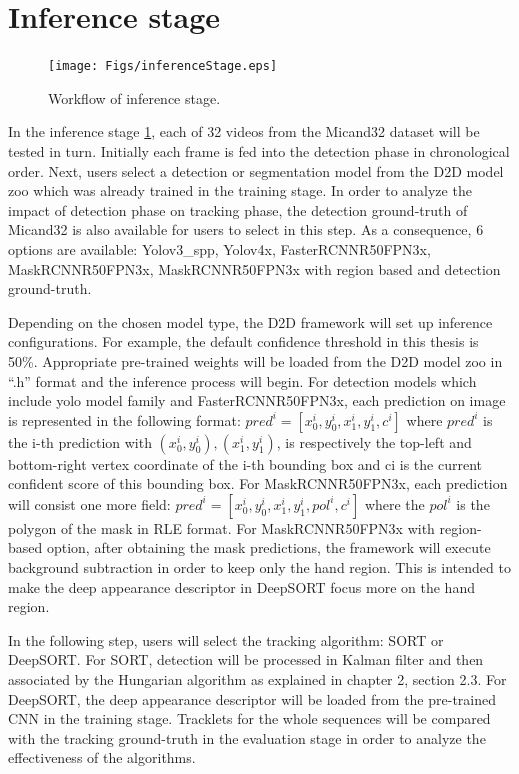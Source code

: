 \section{Inference stage}\label{sec:inferstage}
\begin{figure}[htbp]
\centerline{\texttt{[image: Figs/inferenceStage.eps]}}
\caption{Workflow of inference stage.}
\label{fig:inferenceStage}
\end{figure}

In the inference stage \ref{fig:inferenceStage}, each of 32 videos from the Micand32 dataset will be tested in turn. Initially each frame is fed into the detection phase in chronological order. Next, users select a detection or segmentation model from the D2D model zoo which was already trained in the training stage. In order to analyze the impact of detection phase on tracking phase, the detection ground-truth of Micand32 is also available for users to select in this step. As a consequence, 6 options are available: Yolov3\_spp, Yolov4x, FasterRCNNR50FPN3x, MaskRCNNR50FPN3x, MaskRCNNR50FPN3x with region based and detection ground-truth.

Depending on the chosen model type, the D2D framework will set up inference configurations. For example, the default confidence threshold in this thesis is 50\%. Appropriate pre-trained weights will be loaded from the D2D model zoo in “.h” format and the inference process will begin. For detection models which include yolo model family and FasterRCNNR50FPN3x, each prediction on image is represented in the following format: \(pred^i = [x_0^i, y_0^i, x_1^i, y_1^i, c^i]\) where \(pred^i\) is the i-th prediction with \((x_0^i, y_0^i),  (x_1^i, y_1^i)\), is respectively the top-left and bottom-right vertex coordinate of the i-th bounding box and ci is the current confident score of this bounding box. For MaskRCNNR50FPN3x, each prediction will consist one more field: \(pred^i = [x_0^i, y_0^i, x_1^i, y_1^i, pol^i, c^i]\) where the \(pol^i\) is the polygon of the mask in RLE format. For MaskRCNNR50FPN3x with region-based option, after obtaining the mask predictions, the framework will execute background subtraction in order to keep only the hand region. This is intended to make the deep appearance descriptor in DeepSORT focus more on the hand region.

In the following step, users will select the tracking algorithm: SORT or DeepSORT. For SORT, detection will be processed in Kalman filter and then associated by the Hungarian algorithm as explained in chapter 2, section 2.3. For DeepSORT, the deep appearance descriptor will be loaded from the pre-trained CNN in the training stage. Tracklets for the whole sequences will be compared with the tracking ground-truth in the evaluation stage in order to analyze the effectiveness of the algorithms.

